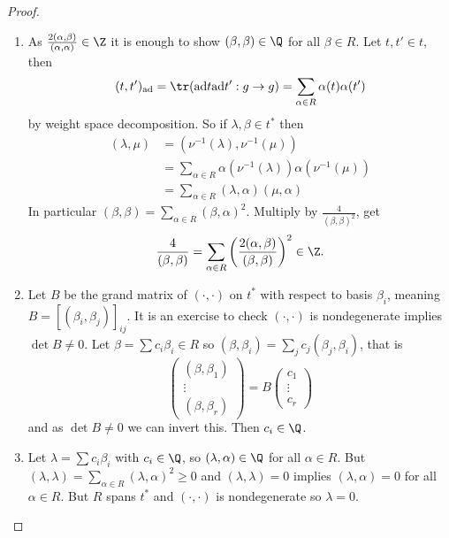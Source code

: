 \documentclass[a4paper]{article}
\newcommand{\ad}{\mathrm{ad}} %
\begin{document}
\begin{proof}\leavevmode
  \begin{enumerate}
  \item As \(\frac{2(\alpha, \beta)}{(\alpha, \alpha)} \in \Z\) it is enough to show \((\beta, \beta) \in \Q\) for all \(\beta \in R\). Let \(t, t' \in t\), then
    \[
      (t, t')_\ad = \tr(\ad t \ad t': g \to g) = \sum_{\alpha \in R} \alpha(t) \alpha(t')
    \]
    by weight space decomposition. So if \(\lambda, \beta \in t^*\) then
    \begin{align*}
      (\lambda, \mu) &= (\nu^{-1}(\lambda), \nu^{-1}(\mu)) \\
                     &= \sum_{\alpha \in R} \alpha(\nu^{-1}(\lambda)) \alpha (\nu^{-1}(\mu)) \\
      &= \sum_{\alpha \in R} (\lambda, \alpha)(\mu, \alpha)
    \end{align*}
    In particular \((\beta, \beta) = \sum_{\alpha \in R} (\beta, \alpha)^2\). Multiply by \(\frac{4}{(\beta, \beta)^2}\), get
    \[
      \frac{4}{(\beta, \beta)} = \sum_{\alpha \in R} \left( \frac{2(\alpha, \beta)}{(\beta, \beta)} \right)^2 \in \Z.
    \]
  \item Let \(B\) be the grand matrix of \((\cdot, \cdot)\) on \(t^*\) with respect to basis \(\beta_i\), meaning \(B = [(\beta_i, \beta_j)]_{ij}\). It is an exercise to check \((\cdot, \cdot)\) is nondegenerate implies \(\det B \neq 0\). Let \(\beta = \sum c_i \beta_i \in R\) so \((\beta, \beta_i) = \sum_j c_j (\beta_j, \beta_i)\), that is
    \[
      \begin{pmatrix}
        (\beta, \beta_1) \\
        \vdots \\
        (\beta, \beta_r)
      \end{pmatrix}
      = B
      \begin{pmatrix}
        c_1 \\
        \vdots \\
        c_r
      \end{pmatrix}
    \]
    and as \(\det B \neq 0\) we can invert this. Then \(c_i \in \Q\).
  \item Let \(\lambda = \sum c_i \beta_i\) with \(c_i \in \Q\), so \((\lambda, \alpha) \in \Q\) for all \(\alpha \in R\). But \((\lambda, \lambda) = \sum_{\alpha \in R}(\lambda, \alpha)^2 \geq 0\) and \((\lambda, \lambda) = 0\) implies \((\lambda, \alpha) = 0\) for all \(\alpha \in R\). But \(R\) spans \(t^*\) and \((\cdot, \cdot)\) is nondegenerate so \(\lambda = 0\).
  \end{enumerate}
\end{proof}
\end{document}
